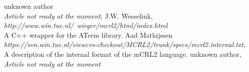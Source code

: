 \index{}\documentclass[a4paper,10pt]{article}
\theoremstyle{plain}
\theoremstyle{definition}
\begin{document}
\newpage
\begin{thebibliography}{99}  
    unknown author \\
     \textit{Article not ready at the moment},
    J.W. Wesselink,
   \textit{http://www.win.tue.nl/~wieger/mcrl2/html/index.html}\\
   A C++ wrapper for the ATerm library.
    Aad Mathijssen\\
   \textit{https://svn.win.tue.nl/viewcvs-checkout/MCRL2/trunk/specs/mcrl2.internal.txt},
   A description of the internal format of the mCRL2 language.
   unknown author,
   \textit{Article not ready at the moment}

\end{thebibliography}

\newpage
\end{document}

